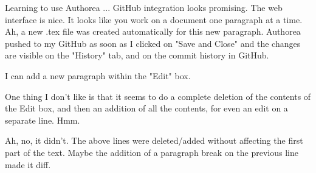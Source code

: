 Learning to use Authorea ... GitHub integration looks promising. The web interface is nice. It looks like you work on a document one paragraph at a time. Ah, a new .tex file was created automatically for this new paragraph. Authorea pushed to my GitHub as soon as I clicked on "Save and Close" and the changes are visible on the "History" tab, and on the commit history in GitHub.

I can add a new paragraph within the "Edit" box.

One thing I don't like is that it seems to do a complete deletion of the contents of the Edit box, and then an addition of all the contents, for even an edit on a separate line. Hmm.

Ah, no, it didn't. The above lines were deleted/added without affecting the first part of the text. Maybe the addition of a paragraph break on the previous line made it diff.